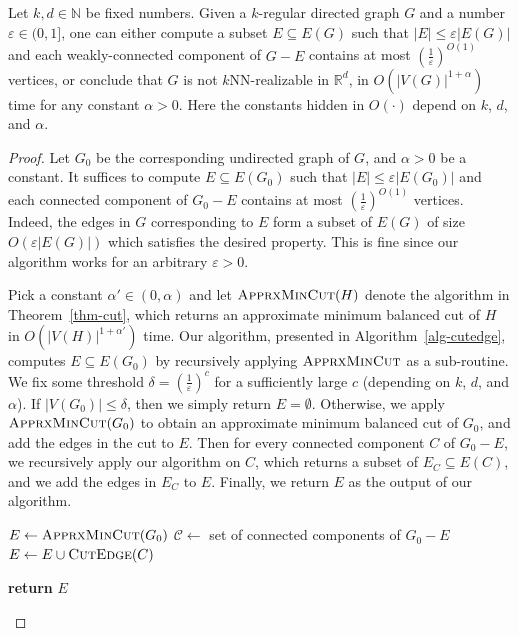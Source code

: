 \begin{lemma} \label{lem-edgeremoval}
Let $k, d \in \mathbb{N}$ be fixed numbers.
Given a $k$-regular directed graph $G$ and a number $\varepsilon \in (0,1]$, one can either compute a subset $E \subseteq E(G)$ such that $|E| \leq \varepsilon |E(G)|$ and each weakly-connected component of $G - E$ contains at most $(\frac{1}{\varepsilon})^{O(1)}$ vertices, or conclude that $G$ is not $k$NN-realizable in $\mathbb{R}^d$, in $O(|V(G)|^{1+\alpha})$ time for any constant $\alpha > 0$.
Here the constants hidden in $O(\cdot)$ depend on $k$, $d$, and $\alpha$.
\end{lemma}
\begin{proof}
Let $G_0$ be the corresponding undirected graph of $G$, and $\alpha > 0$ be a constant.
It suffices to compute $E \subseteq E(G_0)$ such that $|E| \leq \varepsilon |E(G_0)|$ and each connected component of $G_0 - E$ contains at most $(\frac{1}{\varepsilon})^{O(1)}$ vertices.
Indeed, the edges in $G$ corresponding to $E$ form a subset of $E(G)$ of size $O(\varepsilon |E(G)|)$ which satisfies the desired property.
This is fine since our algorithm works for an arbitrary $\varepsilon > 0$.

Pick a constant $\alpha' \in (0,\alpha)$ and let $\textsc{ApprxMinCut}(H)$ denote the algorithm in Theorem~\ref{thm-cut}, which returns an approximate minimum balanced cut of $H$ in $O(|V(H)|^{1+\alpha'})$ time.
Our algorithm, presented in Algorithm~\ref{alg-cutedge}, computes $E \subseteq E(G_0)$ by recursively applying $\textsc{ApprxMinCut}$ as a sub-routine.
We fix some threshold $\delta = (\frac{1}{\varepsilon})^c$ for a sufficiently large $c$ (depending on $k$, $d$, and $\alpha$).
If $|V(G_0)| \leq \delta$, then we simply return $E = \emptyset$.
Otherwise, we apply $\textsc{ApprxMinCut}(G_0)$ to obtain an approximate minimum balanced cut of $G_0$, and add the edges in the cut to $E$.
Then for every connected component $C$ of $G_0 - E$, we recursively apply our algorithm on $C$, which returns a subset of $E_C \subseteq E(C)$, and we add the edges in $E_C$ to $E$.
Finally, we return $E$ as the output of our algorithm.

\begin{algorithm}[htbp]
    \caption{\textsc{CutEdge}$(G_0)$}
    \begin{algorithmic}[1]
            \begin{nolinenumbers}
            \end{nolinenumbers}
        \EndIf
        \State $E \leftarrow \textsc{ApprxMinCut}(G_0)$
        \State $\mathcal{C} \leftarrow$ set of connected components of $G_0 - E$
            \State $E \leftarrow E \cup \textsc{CutEdge}(C)$
            \begin{nolinenumbers}
            \end{nolinenumbers}
        \EndFor
        \State \textbf{return} $E$
    \end{algorithmic}
    \label{alg-cutedge}
\end{algorithm}


\end{proof}
